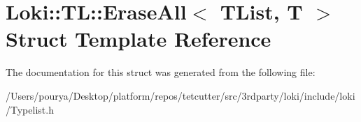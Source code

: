 \hypertarget{structLoki_1_1TL_1_1EraseAll}{}\section{Loki\+:\+:T\+L\+:\+:Erase\+All$<$ T\+List, T $>$ Struct Template Reference}
\label{structLoki_1_1TL_1_1EraseAll}


The documentation for this struct was generated from the following file\+:\begin{DoxyCompactItemize}
\item 
/\+Users/pourya/\+Desktop/platform/repos/tetcutter/src/3rdparty/loki/include/loki/Typelist.\+h\end{DoxyCompactItemize}
